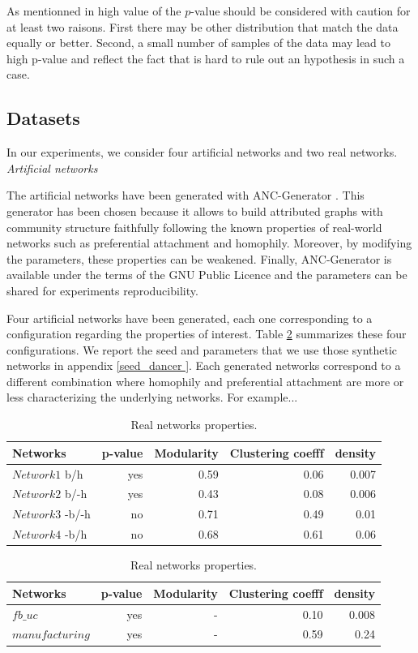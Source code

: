 As mentionned in \cite{clauset2009power} high value of the $p$-value should be considered with caution for at least two raisons. First there may be other distribution that match the data equally or better. Second, a small number of samples of the data may lead to high p-value and reflect the fact that is hard to rule out an hypothesis in such a case.

\subsection{Datasets}
In our experiments, we consider four artificial networks and two real networks.\\

\textit{Artificial networks}

The artificial networks have been generated with ANC-Generator \cite{largeron2015}. This generator has been chosen because it allows to build attributed graphs with  community structure faithfully following the known properties of real-world networks such as preferential attachment and homophily.
Moreover, by modifying the parameters, these properties can be weakened. Finally, ANC-Generator is available under the terms of the GNU Public Licence and the        parameters can be shared for experiments reproducibility.

Four artificial networks have been generated, each one corresponding to a configuration  regarding the properties of interest.
Table \ref{table:artificial_networks} summarizes these four configurations. We report the seed and parameters that we use those synthetic networks in appendix \ref{seed_dancer	}. Each generated networks correspond to a different combination where homophily and preferential attachment are more or less characterizing the underlying networks. For example...

\begin{table}[h] \label{table:artificial_networks}
	\caption{Artificial networks properties.}
	\begin{tabular}{lrrrr}
		\hline
		Networks   &  p-value    &  Modularity & Clustering coefff & density   \\
		\hline
		$Network1$ b/h   & yes &0.59  & 0.06 & 0.007  \\
		$Network2$ b/-h  & yes &0.43  & 0.08 & 0.006\\
		$Network3$ -b/-h & no  &0.71  & 0.49 & 0.01 \\
		$Network4$ -b/h  & no  &0.68  & 0.61 & 0.06 \\
		\hline
	\end{tabular}
	\caption{Real networks properties.}
	\begin{tabular}{lrrrr}
		\hline
		Networks    &  p-value    &  Modularity & Clustering coefff & density   \\
		\hline
		$fb\_uc$          & yes & -  & 0.10 & 0.008 \\
		$manufacturing$   & yes & -  & 0.59 & 0.24 \\
	\end{tabular}
\end{table}

